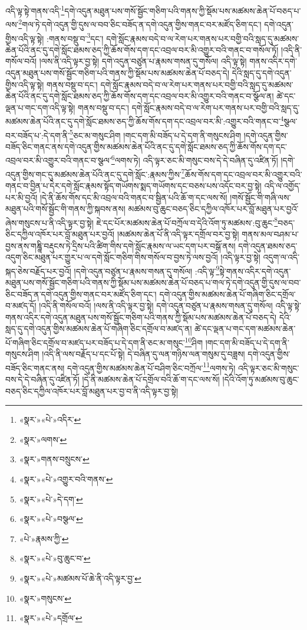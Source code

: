 འདི་ལྟ་སྟེ་གནས་འདི་\footnote{«སྣར་»«པེ་»འདིར་}དགེ་འདུན་མཐུན་པས་གསོ་སྦྱོང་གཅིག་པའི་གནས་ཀྱི་སྡོམ་པས་མཚམས་ཆེན་པོ་བཅད་པ་ལས་\footnote{«སྣར་»ལགས་}གལ་ཏེ་དགེ་འདུན་གྱི་དུས་ལ་བབ་ཅིང་བཟོད་ན་དགེ་འདུན་གྱིས་གནང་བར་མཛོད་ཅིག་དང་། དགེ་འདུན་གྱིས་འདི་ལྟ་སྟེ། :གནས་བསྡུ་བ་\footnote{«སྣར་»གནས་བསྲུངས་}དང་། དགེ་སློང་རྣམས་བདེ་བ་ལ་རེག་པར་གནས་པར་བགྱི་བའི་སླད་དུ་མཚམས་ཆེན་པོའི་ནང་དུ་དགེ་སློང་ཐམས་ཅད་ཀྱི་ཆོས་གོས་དག་དང་འབྲལ་བར་མི་འགྱུར་བའི་གནང་བ་གསོལ་ཏོ། །འདི་ནི་གསོལ་བའོ། །ལས་ནི་འདི་ལྟར་བྱ་སྟེ། དགེ་འདུན་བཙུན་པ་རྣམས་གསན་དུ་གསོལ། འདི་ལྟ་སྟེ། གནས་འདིར་དགེ་འདུན་མཐུན་པས་གསོ་སྦྱོང་གཅིག་པའི་གནས་ཀྱི་སྡོམ་པས་མཚམས་ཆེན་པོ་བཅད་དེ། དེའི་སླད་དུ་དགེ་འདུན་གྱིས་འདི་ལྟ་སྟེ། གནས་བསྡུ་བ་དང་། དགེ་སློང་རྣམས་བདེ་བ་ལ་རེག་པར་གནས་པར་བགྱི་བའི་སླད་དུ་མཚམས་ཆེན་པོའི་ནང་དུ་དགེ་སློང་ཐམས་ཅད་ཀྱི་ཆོས་གོས་དག་དང་འབྲལ་བར་མི་འགྱུར་བའི་གནང་བ་སྩོལ་ན། ཚེ་དང་ལྡན་པ་གང་དག་འདི་ལྟ་སྟེ། གནས་བསྡུ་བ་དང་། དགེ་སློང་རྣམས་བདེ་བ་ལ་རེག་པར་གནས་པར་བགྱི་བའི་སླད་དུ་མཚམས་ཆེན་པོའི་ནང་དུ་དགེ་སློང་ཐམས་ཅད་ཀྱི་ཆོས་གོས་དག་དང་འབྲལ་བར་མི་:འགྱུར་བའི་གནང་བ་\footnote{«སྣར་»«པེ་»འགྱུར་བའི་གནས་}སྩལ་བར་བཟོད་པ་:དེ་དག་ནི་\footnote{«སྣར་»«པེ་»དེ་དག་}ཅང་མ་གསུང་ཤིག །གང་དག་མི་བཟོད་པ་དེ་དག་ནི་གསུངས་ཤིག །དགེ་འདུན་གྱིས་བཟོད་ཅིང་གནང་ནས་དགེ་འདུན་གྱིས་མཚམས་ཆེན་པོའི་ནང་དུ་དགེ་སློང་ཐམས་ཅད་ཀྱི་ཆོས་གོས་དག་དང་འབྲལ་བར་མི་འགྱུར་བའི་གནང་བ་སྩལ་\footnote{«སྣར་»«པེ་»བསྩལ་}ལགས་ཏེ། འདི་ལྟར་ཅང་མི་གསུང་བས་དེ་དེ་བཞིན་དུ་འཛིན་ཏོ། །དགེ་འདུན་གྱིས་གང་དུ་མཚམས་ཆེན་པོའི་ནང་དུ་དགེ་སློང་:རྣམས་ཀྱིས་\footnote{«པེ་»རྣམས་ཀྱི་}ཆོས་གོས་དག་དང་འབྲལ་བར་མི་འགྱུར་བའི་གནང་བ་བྱིན་པ་དེར་དགེ་སློང་རྣམས་སྟོད་གཡོགས་སྨད་གཡོགས་དང་བཅས་པས་འདོང་བར་བྱ་སྟེ། འདི་ལ་འགྱོད་པར་མི་བྱའོ། །དེ་ནི་ཆོས་གོས་དང་མི་འབྲལ་བའི་གནང་བ་སྦྱིན་པའི་ཆོ་ག་དང་ལས་སོ། །གསོ་སྦྱོང་གི་གཞི་ལས་མཐུན་པའི་གསོ་སྦྱོང་གི་གནས་ཀྱི་སྐབས་ནས། མཚམས་བུ་ཆུང་བཅད་ཅིང་དཀྱིལ་འཁོར་པར་བློ་མཐུན་པར་བྱའོ་ཞེས་གསུངས་པ་ནི་འདི་ལྟར་བྱ་སྟེ། ཇེ་དང་པོར་མཚམས་ཆེན་པོ་བཀྲོལ་བ་དེའི་འོག་ཏུ་མཚམས་:བུ་ཆུང་\footnote{«སྣར་»«པེ་»བུ་ཆུང་བ་}བཅད་ཅིང་དཀྱིལ་འཁོར་པར་བློ་མཐུན་པར་བྱའོ། །མཚམས་ཆེན་པོ་ནི་འདི་ལྟར་དགྲོལ་བར་བྱ་སྟེ། གནས་མལ་བཤམ་པ་བྱས་ནས་གཎྜཱི་བརྡུངས་ཏེ་དྲིས་པའི་ཚིག་གིས་དགེ་སློང་རྣམས་ལ་ཡང་དག་པར་བསྒོ་ནས། དགེ་འདུན་ཐམས་ཅད་འདུག་ཅིང་མཐུན་པར་གྱུར་པ་ལ་དགེ་སློང་གཅིག་གིས་གསོལ་བ་བྱས་ཏེ་ལས་བྱའོ། །འདི་ལྟར་བྱ་སྟེ། འདུག་ལ་འདི་སྐད་ཅེས་བརྗོད་པར་བྱའོ། །དགེ་འདུན་བཙུན་པ་རྣམས་གསན་དུ་གསོལ། :འདི་ལྟ་\footnote{«སྣར་»«པེ་»མཚམས་པོ་ཆེ་ནི་འདི་ལྟར་བྱ་}སྟེ་གནས་འདིར་དགེ་འདུན་མཐུན་པས་གསོ་སྦྱོང་གཅིག་པའི་གནས་ཀྱི་སྡོམ་པས་མཚམས་ཆེན་པོ་བཅད་པ་གལ་ཏེ་དགེ་འདུན་གྱི་དུས་ལ་བབ་ཅིང་བཟོད་ན་དགེ་འདུན་གྱིས་གནང་བར་མཛོད་ཅིག་དང་། དགེ་འདུན་གྱིས་མཚམས་ཆེན་པོ་གཞིག་ཅིང་དགྲོལ་བ་མཛད་དོ། །འདི་ནི་གསོལ་བའོ། །ལས་ནི་འདི་ལྟར་བྱ་སྟེ། དགེ་འདུན་བཙུན་པ་རྣམས་གསན་དུ་གསོལ། འདི་ལྟ་སྟེ་གནས་འདིར་དགེ་འདུན་མཐུན་པས་གསོ་སྦྱོང་གཅིག་པའི་གནས་ཀྱི་སྡོམ་པས་མཚམས་ཆེན་པོ་བཅད་དེ། དེའི་སླད་དུ་དགེ་འདུན་གྱིས་མཚམས་ཆེན་པོ་གཞིག་ཅིང་དགྲོལ་བ་མཛད་ན། ཚེ་དང་ལྡན་པ་གང་དག་མཚམས་ཆེན་པོ་གཞིག་ཅིང་དགྲོལ་བ་མཛད་པར་བཟོད་པ་དེ་དག་ནི་ཅང་མ་གསུང་\footnote{«སྣར་»གསུངས་}ཤིག །གང་དག་མི་བཟོད་པ་དེ་དག་ནི་གསུངས་ཤིག །འདི་ནི་ལས་བརྗོད་པ་དང་པོ་སྟེ། དེ་བཞིན་དུ་ལན་གཉིས་ལན་གསུམ་དུ་བཟླས། དགེ་འདུན་གྱིས་བཟོད་ཅིང་གནང་ནས། དགེ་འདུན་གྱིས་མཚམས་ཆེན་པོ་བཤིག་ཅིང་བཀྲོལ་\footnote{«སྣར་»«པེ་»དགྲོལ་}ལགས་ཏེ། འདི་ལྟར་ཅང་མི་གསུང་བས་དེ་དེ་བཞིན་དུ་འཛིན་ཏོ། །དེ་ནི་མཚམས་ཆེན་པོ་དགྲོལ་བའི་ཆོ་ག་དང་ལས་སོ། །དེའི་འོག་ཏུ་མཚམས་བུ་ཆུང་བཅད་ཅིང་དཀྱིལ་འཁོར་པར་བློ་མཐུན་པར་བྱ་བ་ནི་འདི་ལྟར་བྱ་སྟེ། 